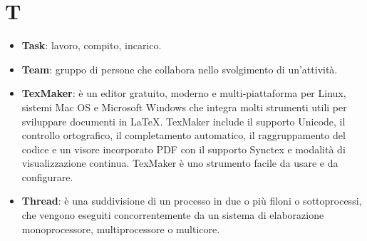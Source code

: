 \section{T}
\begin{itemize}
	\item
	\textbf{Task}: lavoro, compito, incarico.
	\item
	\textbf{Team}: gruppo di persone che collabora nello svolgimento di un'attività.
	\item
	\textbf{TexMaker}: è un editor gratuito, moderno e multi-piattaforma per Linux, sistemi Mac OS e Microsoft Windows che integra molti strumenti utili per sviluppare documenti in \LaTeX.
	TexMaker include il supporto Unicode, il controllo ortografico, il completamento automatico, il raggruppamento del codice e un visore incorporato PDF con il supporto Synctex e modalità di visualizzazione continua.
	TexMaker è uno strumento facile da usare e da configurare.
	\item
	\textbf{Thread}:  è una suddivisione di un processo in due o più filoni o sottoprocessi, che vengono eseguiti concorrentemente da un sistema di elaborazione monoprocessore, multiprocessore o multicore.
	
\end{itemize}
